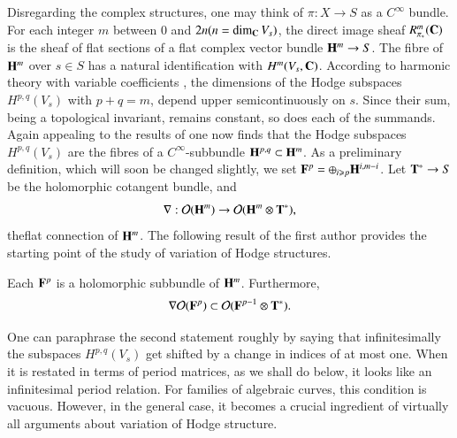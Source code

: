 Disregarding the complex structures, one may think of $\pi: X \to S$ as a $C^\infty$ bundle. For each integer $m$ between $0$ and $2n (n = \dim_{\mathbf{C}} V_s)$, the direct image sheaf $R^m_{\pi_\ast}(\mathbf{C})$ is the sheaf of flat sections of a flat complex vector bundle $\mathbf{H}^m \to S$. The fibre of $\mathbf{H}^m$ over $s \in S$ has a natural identification with $H^m (V_s, \mathbf{C})$. According to harmonic theory with variable coefficients \cite{art4-key33}, the dimensions of the Hodge subspaces $H^{p,q} (V_s)$ with $p+q=m$, depend upper semicontinuously on $s$. Since their sum, being a topological invariant, remains constant, so does each of the summands. Again appealing to the results of \cite{art4-key33} one now finds that the Hodge subspaces $H^{p,q} (V_s)$ are the fibres of a $C^\infty$-subbundle $\mathbf{H}^{p,q} \subset \mathbf{H}^m$.  As a preliminary definition, which will soon be changed slightly, we set $\mathbf{F}^p = \oplus_{i \geqslant p} \mathbf{H}^{i, m-i}$. Let $\mathbf{T}^\ast \to S$ be the holomorphic cotangent bundle, and  
$$
\nabla : \mathcal{O} (\mathbf{H}^m) \to \mathcal{O} (\mathbf{H}^m \otimes \mathbf{T}^\ast),
$$
the\pageoriginale flat connection of $\mathbf{H}^m$. The following result of the first author provides the starting point of the study of variation of Hodge structures.

\begin{theorem}\label{art4-thm3.1}
Each $\mathbf{F}^p$ is a holomorphic subbundle of $\mathbf{H}^m$. Furthermore,
$$
\nabla \mathcal{O}(\mathbf{F}^p) \subset \mathcal{O} (\mathbf{F}^{p-1} \otimes \mathbf{T}^\ast).
$$
\end{theorem}

One can paraphrase the second statement roughly by saying that infinitesimally the subspaces $H^{p,q}(V_s)$ get shifted by a change in indices of at most one. When it is restated in terms of period matrices, as we shall do below, it looks like an infinitesimal period relation. For families of algebraic curves, this condition is vacuous. However, in the general case, it becomes a crucial ingredient of virtually all arguments about variation of Hodge structure.

